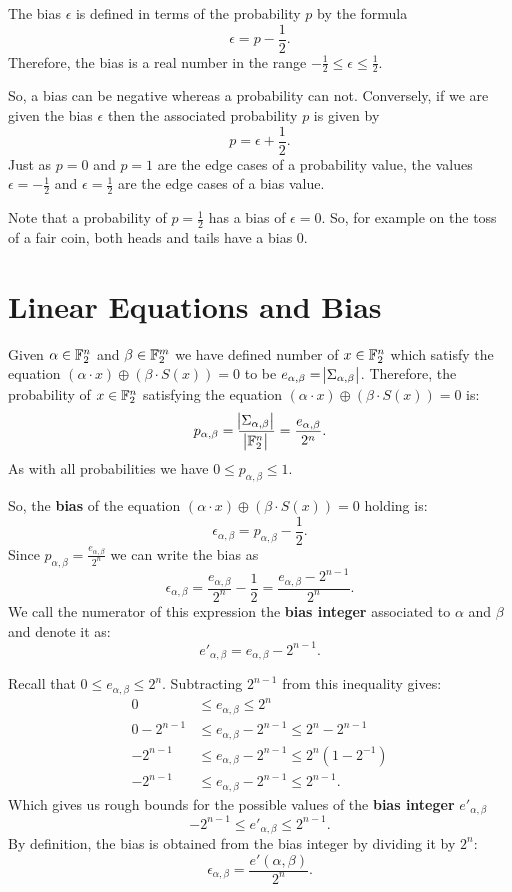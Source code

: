 \begin{tcolorbox}[colback=white,colframe=defcolor,arc=5pt,title={\color{white}\bf Bias}]
\begin{definition}
The bias $\epsilon$ is defined in terms of the probability $p$ by the formula \[
\epsilon = p - \frac{1}{2}.
\] Therefore, the bias is a real number in the range $-\frac{1}{2}\leq\epsilon\leq\frac{1}{2}$.
\end{definition}
\end{tcolorbox}
So, a bias can be negative whereas a probability can not. Conversely, if we are given the bias $\epsilon$ then the associated probability $p$ is given by \[
p=\epsilon+\frac{1}{2}.
\] Just as $p=0$ and $p=1$ are the edge cases of a probability value, the values $\epsilon=-\frac{1}{2}$ and $\epsilon=\frac{1}{2}$ are the edge cases of a bias value.

Note that a probability of $p=\frac{1}{2}$ has a bias of $\epsilon=0$. So, for example on the toss of a fair coin, both heads and tails have a bias $0$.

\section{Linear Equations and Bias}
Given $\alpha\in\mathbb{F}_2^n$ and $\beta\in\mathbb{F}_2^m$ we have defined number of $x\in\mathbb{F}_2^n$ which satisfy the equation $(\alpha\cdot x)\oplus(\beta\cdot S(x))=0$ to be $e_{\alpha,\beta}=\abs{\Sigma_{\alpha,\beta}}$. Therefore, the probability of $x\in\mathbb{F}_2^n$ satisfying the equation $(\alpha\cdot x)\oplus(\beta\cdot S(x))=0$ is: \[
p_{\alpha,\beta}=\frac{\abs{\Sigma_{\alpha,\beta}}}{\abs{\mathbb{F}_2^n}}=\frac{e_{\alpha,\beta}}{2^n}.
\] As with all probabilities we have $0\leq p_{\alpha,\beta}\leq 1$.

So, the \textbf{bias} of the equation $(\alpha\cdot x)\oplus(\beta\cdot S(x))=0$ holding is: \[
\epsilon_{\alpha,\beta}=p_{\alpha,\beta}-\frac{1}{2}.
\] Since $p_{\alpha,\beta}=\frac{e_{\alpha,\beta}}{2^n}$ we can write the bias as \[
\epsilon_{\alpha,\beta}=\frac{e_{\alpha,\beta}}{2^n}-\frac{1}{2}=\frac{e_{\alpha,\beta}-2^{n-1}}{2^n}.
\] We call the numerator of this expression the \textbf{bias integer} associated to $\alpha$ and $\beta$ and denote it as: \[
e'_{\alpha,\beta}=e_{\alpha,\beta}-2^{n-1}.
\]

Recall that $0\leq e_{\alpha,\beta}\leq 2^n$. Subtracting $2^{n-1}$ from this inequality gives:
\begin{align*}
0&\leq e_{\alpha,\beta}\leq 2^n\\
0-2^{n-1}&\leq e_{\alpha,\beta}-2^{n-1}\leq 2^n-2^{n-1}\\
-2^{n-1}&\leq e_{\alpha,\beta}-2^{n-1}\leq 2^n(1-2^{-1})\\
-2^{n-1}&\leq e_{\alpha,\beta}-2^{n-1}\leq 2^{n-1}.
\end{align*}
Which gives us rough bounds for the possible values of the \textbf{bias integer} $e'_{\alpha,\beta}$ \[
-2^{n-1}\leq e'_{\alpha,\beta}\leq 2^{n-1}.
\] By definition, the bias is obtained from the bias integer by dividing it by $2^n$: \[
\epsilon_{\alpha,\beta}=\frac{e'(\alpha,\beta)}{2^n}.
\]

